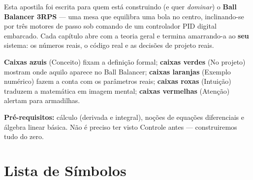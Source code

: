 Esta apostila foi escrita para quem est\'a construindo (e quer \emph{dominar}) o
\textbf{Ball Balancer 3RPS} --- uma mesa que equilibra uma bola no centro,
inclinando-se por tr\^es motores de passo sob comando de um controlador PID
digital embarcado. Cada cap\'itulo abre com a teoria geral e termina amarrando-a
ao \textbf{seu} sistema: os n\'umeros reais, o c\'odigo real e as decis\~oes de
projeto reais.

\begin{conceito}
\textbf{Caixas azuis} (Conceito) fixam a defini\c{c}\~ao formal;
\textbf{caixas verdes} (No projeto) mostram onde aquilo aparece no Ball Balancer;
\textbf{caixas laranjas} (Exemplo num\'erico) fazem a conta com os par\^ametros
reais; \textbf{caixas roxas} (Intui\c{c}\~ao) traduzem a matem\'atica em imagem
mental; \textbf{caixas vermelhas} (Aten\c{c}\~ao) alertam para armadilhas.
\end{conceito}

\noindent\textbf{Pr\'e-requisitos:} c\'alculo (derivada e integral), no\c{c}\~oes
de equa\c{c}\~oes diferenciais e \'algebra linear b\'asica. N\~ao \'e preciso ter
visto Controle antes --- construiremos tudo do zero.

\tableofcontents
\listoffigures
\listoftables

\chapter*{Lista de S\'imbolos}

